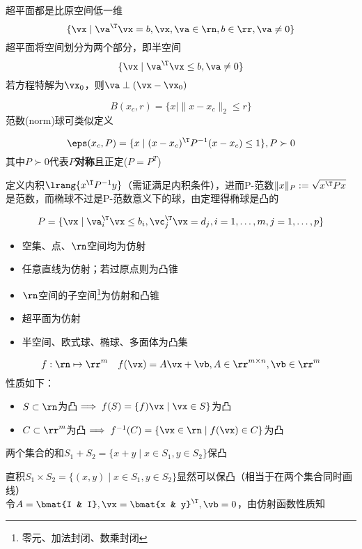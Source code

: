 \documentclass{note}
\begin{document}
\begin{definition}
超平面都是比原空间低一维
\[\{\vx\mid \va^\T\vx=b,\vx,\va\in\rn,b\in\rr,\va\ne 0\}\]
超平面将空间划分为两个部分，即半空间
\[\{\vx\mid \va^\T\vx\leq b,\va\ne 0\}\]
若方程特解为$\vx_0$，则$\va\perp(\vx-\vx_0)$
\end{definition}
\begin{definition}
\[B(x_c,r)=\{x\mid\|x-x_c\|_2\leq r\}\]
范数(norm)球可类似定义
\end{definition}
\begin{definition}[椭球(ellipsoid)]
\[\eps(x_c,P)=\{x\mid(x-x_c)^\T P^{-1}(x-x_c)\leq 1\},P\succ 0\]
其中$P\succ 0$代表$P$\textbf{对称}且正定($P=P^T$)
\end{definition}
\begin{analysis}
定义内积$\lrang{x^\T P^{-1}y}$（需证满足内积条件），进而P-范数$\|x\|_P:=\sqrt{x^\T Px}$是范数，而椭球不过是P-范数意义下的球，由定理得椭球是凸的
\end{analysis}
\begin{definition}
\[P=\{\vx\mid\va_i^\T\vx\leq b_i,\vc_j^\T\vx=d_j,i=1,\ldots,m,j=1,\ldots,p\}\]
\end{definition}
\begin{example}
\begin{itemize}
	\item 空集、点、$\rn$空间均为仿射
	\item 任意直线为仿射；若过原点则为凸锥
	\item $\rn$空间的子空间\footnote{零元、加法封闭、数乘封闭}为仿射和凸锥
	\item 超平面为仿射
	\item 半空间、欧式球、椭球、多面体为凸集
\end{itemize}
\end{example}

\begin{definition}[仿射函数]
\[f:\rn\mapsto\rr^m\quad f(\vx)=A\vx+\vb,A\in\rr^{m\times n},\vb\in\rr^m\]
性质如下：
\begin{itemize}
	\item $S\subset\rn$为凸$\implies f(S)=\{f)\vx\mid\vx\in S\}$为凸
	\item $C\subset\rr^m$为凸$\implies f^{-1}(C)=\{\vx\in\rn\mid f(\vx)\in C\}$为凸
\end{itemize}
\end{definition}
\begin{example}
两个集合的和$S_1+S_2=\{x+y\mid x\in S_1,y\in S_2\}$保凸
\end{example}
\begin{analysis}
直积$S_1\times S_2=\{(x,y)\mid x\in S_1,y\in S_2\}$显然可以保凸（相当于在两个集合同时画线）\\
令$A=\bmat{I & I},\vx=\bmat{x & y}^\T,\vb=0$，由仿射函数性质知
\end{analysis}
\end{document}
